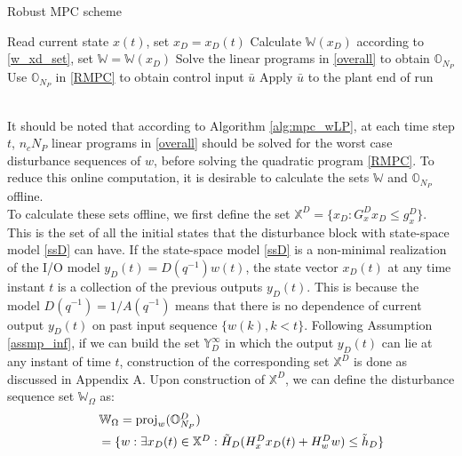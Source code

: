 \documentclass[letterpaper, 10 pt, conference]{ieeeconf}  %
\begin{document}
   \begin{algorithm}[t]
   	\caption{Robust MPC scheme}\label{alg:mpc_wLP}
   	\begin{algorithmic}[1]
   		\Repeat[every sampling instant:  $t=0,1,\ldots$]
   		\State Read current state $x(t)$, set $x_D = x_D(t)$
   		\State Calculate $\mathbb{W}(x_D)$ according to \eqref{w_xd_set}, set $\mathbb{W}=\mathbb{W}(x_D)$
   		\State Solve the linear programs in \eqref{overall} to obtain $\mathbb{O}_{N_P}$
   		\State Use $\mathbb{O}_{N_P}$ in \eqref{RMPC} to obtain control input $\bar{u}$
   		\State Apply $\bar{u}$ to the plant
   		\Until end of run
   	\end{algorithmic}
   \end{algorithm}
\\
\indent
  It should be noted that according to Algorithm \ref{alg:mpc_wLP}, at each time step $t$, $n_cN_P$ linear programs in \eqref{overall} should be solved for the worst case disturbance sequences of $w$, before solving the quadratic program \eqref{RMPC}. To reduce this online computation, it is desirable to calculate the sets $\mathbb{W}$ and $\mathbb{O}_{N_P}$ offline. 
  \\ \indent
  To calculate these sets offline, we first define the set $\mathbb{X}^D = \{x_D: G^D_xx_D \leq g^D_x\}$. This is the set of all the initial states that the disturbance block with state-space model \eqref{ssD} can have. If the state-space model \eqref{ssD} is a non-minimal realization of the I/O model $y_D(t) = D(q^{-1})w(t)$, the state vector $x_D(t)$ at any time instant $t$ is a collection of the previous outputs $y_D(t)$. This is because the model $D(q^{-1})= 1/A(q^{-1})$ means that there is no dependence of current output $y_D(t)$ on past input sequence $\{w(k),k < t\}$. Following Assumption \ref{assmp_inf}, if we can build the set $\mathbb{Y}_D^{\infty}$ in which the output $y_D(t)$ can lie at any instant of time $t$, construction of the corresponding set $\mathbb{X}^D$ is done as discussed in Appendix A. Upon construction of $\mathbb{X}^D$, we can define the disturbance sequence set $\mathbb{W}_{\Omega}$ as:
  \\
  \begin{equation}
  \begin{matrix}
  \hspace{-130pt}
  \mathbb{W}_{\Omega} = \text{proj}_w(\mathbb{O}_{N_P}^D)
  \vspace{5pt}
  \\
  \hspace{20pt}
  =\{w: \exists x_D(t) \in \mathbb{X}^D : \tilde{H}_D(H_x^Dx_D(t)+H_w^Dw) \leq \tilde{h}_D\}
  \end{matrix}
  \label{proj_set}
  \end{equation}
\end{document}
